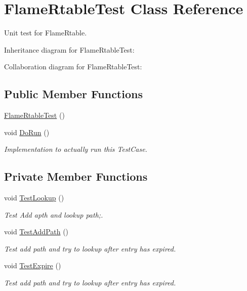 \hypertarget{classFlameRtableTest}{}\section{Flame\+Rtable\+Test Class Reference}
\label{classFlameRtableTest}


Unit test for Flame\+Rtable.  




Inheritance diagram for Flame\+Rtable\+Test\+:


Collaboration diagram for Flame\+Rtable\+Test\+:
\subsection*{Public Member Functions}
\begin{DoxyCompactItemize}
\item 
\hyperlink{classFlameRtableTest_ac672cdf03e56f750bf03253fa4128c19}{Flame\+Rtable\+Test} ()
\item 
void \hyperlink{classFlameRtableTest_acc465c9fd35c2ece212f63ee5f7bbe07}{Do\+Run} ()
\begin{DoxyCompactList}\small\item\em Implementation to actually run this Test\+Case. \end{DoxyCompactList}\end{DoxyCompactItemize}
\subsection*{Private Member Functions}
\begin{DoxyCompactItemize}
\item 
void \hyperlink{classFlameRtableTest_a807e0defb13ad4a12fb25e7239b8d75f}{Test\+Lookup} ()
\begin{DoxyCompactList}\small\item\em Test Add apth and lookup path;. \end{DoxyCompactList}\item 
void \hyperlink{classFlameRtableTest_a513e3129b499e469bb8cbd77d57dabce}{Test\+Add\+Path} ()
\begin{DoxyCompactList}\small\item\em Test add path and try to lookup after entry has expired. \end{DoxyCompactList}\item 
void \hyperlink{classFlameRtableTest_a3d8fdefe5ecc1801939b6fb82e6c4d18}{Test\+Expire} ()
\begin{DoxyCompactList}\small\item\em Test add path and try to lookup after entry has expired. \end{DoxyCompactList}\end{DoxyCompactItemize}
